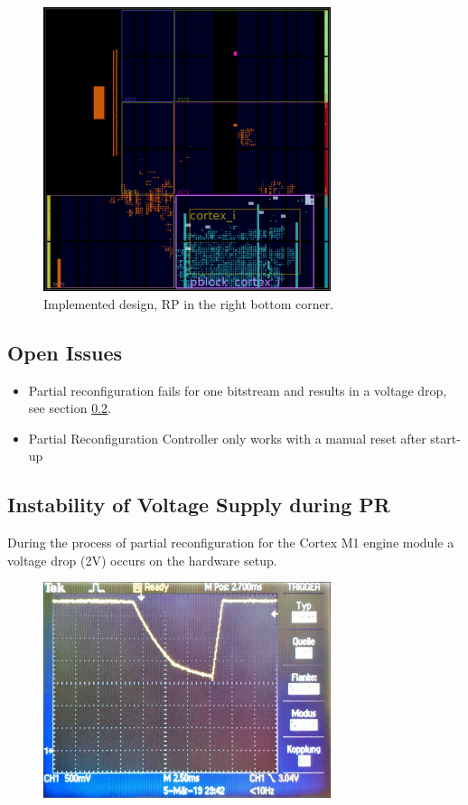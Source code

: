 \begin{figure}[h!]
    \centering
    \includegraphics[width=0.75\textwidth]{figures/implementation.pdf}
    \caption{Implemented design, \gls{RP} in the right bottom corner.}\label{fig:implementation}
\end{figure}

\subsection{Open Issues}
\begin{itemize}
    \item Partial reconfiguration fails for one bitstream and results in a voltage drop, see section \ref{sec:voltageDrop}.
    \item Partial Reconfiguration Controller only works with a manual reset after start-up
\end{itemize}
\subsection{Instability of Voltage Supply during \gls{PR}}\label{sec:voltageDrop}
During the process of partial reconfiguration for the Cortex M1 engine module a voltage drop (2V) occurs on the hardware setup.
\begin{figure}[h!]
    \centering
    \includegraphics[width=0.75\textwidth]{figures/voltageDropPR.jpg}
    \caption{}\label{fig:voltageDropPR}
\end{figure}
